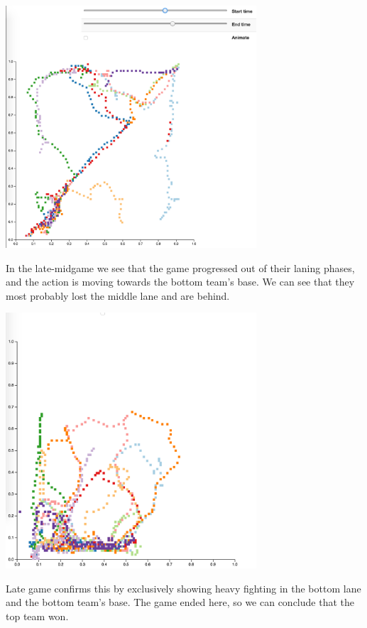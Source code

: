 \includegraphics[width=0.7\textwidth]{midgame}

In the late-midgame we see that the game progressed out of their laning phases, and the action is moving towards the bottom team's base. We can see that they most probably lost the middle lane and are behind.

\includegraphics[width=0.7\textwidth]{lategame}

Late game confirms this by exclusively showing heavy fighting in the bottom lane and the bottom team's base. The game ended here, so we can conclude that the top team won.

